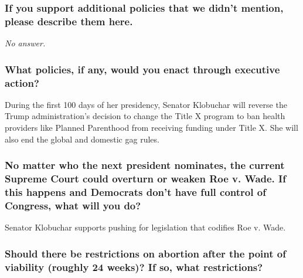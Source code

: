 \hypertarget{if-you-support-additional-policies-that-we-didnt-mention-please-describe-them-here-3}{%
\subsubsection{If you support additional policies that we didn't
mention, please describe them
here.}\label{if-you-support-additional-policies-that-we-didnt-mention-please-describe-them-here-3}}

\emph{No answer.}

\hypertarget{what-policies-if-any-would-you-enact-through-executive-action-3}{%
\subsubsection{What policies, if any, would you enact through executive
action?}\label{what-policies-if-any-would-you-enact-through-executive-action-3}}

During the first 100 days of her presidency, Senator Klobuchar will
reverse the Trump administration's decision to change the Title X
program to ban health providers like Planned Parenthood from receiving
funding under Title X. She will also end the global and domestic gag
rules.

\hypertarget{no-matter-who-the-next-president-nominates-the-current-supreme-court-could-overturn-or-weaken-roe-v-wade-if-this-happens-and-democrats-dont-have-full-control-of-congress-what-will-you-do-3}{%
\subsubsection{No matter who the next president nominates, the current
Supreme Court could overturn or weaken Roe v. Wade. If this happens and
Democrats don't have full control of Congress, what will you
do?}\label{no-matter-who-the-next-president-nominates-the-current-supreme-court-could-overturn-or-weaken-roe-v-wade-if-this-happens-and-democrats-dont-have-full-control-of-congress-what-will-you-do-3}}

Senator Klobuchar supports pushing for legislation that codifies Roe v.
Wade.

\hypertarget{should-there-be-restrictions-on-abortion-after-the-point-of-viability-roughly-24-weeks-if-so-what-restrictions-3}{%
\subsubsection{Should there be restrictions on abortion after the point
of viability (roughly 24 weeks)? If so, what
restrictions?}\label{should-there-be-restrictions-on-abortion-after-the-point-of-viability-roughly-24-weeks-if-so-what-restrictions-3}}

